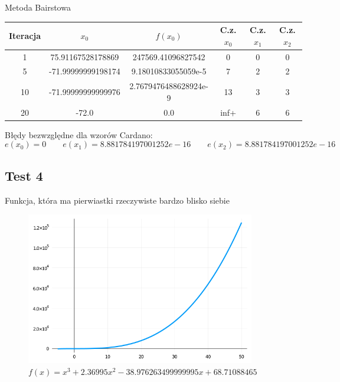 \documentclass[a4paper]{article}
\begin{document}
    \begin{center}
        Metoda Bairstowa
    \end{center}
    \begin{center}
        \begin{tabular}{|c|c|c|c|c|c|} 
            \hline
            Iteracja & $x_0$ & $f(x_0)$ & C.z. $x_0$ & C.z. $x_1$ & C.z. $x_2$ \\
            \hline
            1 & 75.91167528178869 & 247569.41096827542 & 0 & 0 & 0 \\ 
            \hline
            5 & -71.99999999198174 & 9.18010833055059e-5 & 7 & 2 & 2 \\ 
            \hline
            10 & -71.99999999999976 & 2.7679476488628924e-9 & 13 & 3 & 3 \\
            \hline
            20 & -72.0 & 0.0 & inf+ & 6 & 6 \\
            \hline
        \end{tabular}
    \end{center}

    \vspace{5mm}

    \begin{center}
        Błędy bezwzględne dla wzorów Cardano:
        \[
            e(x_0) = 0 \qquad e(x_1) = 8.881784197001252e-16 \qquad e(x_2) = 8.881784197001252e-16  
        \]
    \end{center}

\newpage
\subsection{Test 4}
    Funkcja, która ma pierwiastki rzeczywiste bardzo blisko siebie
    \begin{figure}[h]
        \centering
        \includegraphics[width=10cm]{4}
        \caption{$f(x) = x^3 + 2.36995x^2 - 38.976263499999995x + 68.71088465$}
    \end{figure}
\end{document}
